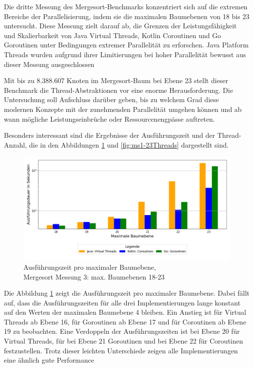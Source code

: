 \documentclass[fontsize=12pt,paper=a4,twoside=semi,parskip=half-,headsepline,headinclude]{scrreprt}
\begin{document}
Die dritte Messung des Mergesort-Benchmarks konzentriert sich auf die extremen Bereiche der Parallelisierung, indem sie die maximalen Baumebenen von 18 bis 23 untersucht. Diese Messung zielt darauf ab, die Grenzen der Leistungsfähigkeit und Skalierbarkeit von Java Virtual Threads, Kotlin Coroutinen und Go Goroutinen unter Bedingungen extremer Parallelität zu erforschen. Java Platform Threads wurden aufgrund ihrer Limitierungen bei hoher Parallelität bewusst aus dieser Messung ausgeschlossen

Mit bis zu 8.388.607 Knoten im Mergesort-Baum bei Ebene 23 stellt dieser Benchmark die Thread-Abstraktionen vor eine enorme Herausforderung. Die Untersuchung soll Aufschluss darüber geben, bis zu welchem Grad diese modernen Konzepte mit der zunehmenden Parallelität umgehen können und ab wann mögliche Leistungseinbrüche oder Ressourcenengpässe auftreten.

Besonders interessant sind die Ergebnisse der Ausführungszeit und der Thread-Anzahl, die in den Abbildungen \ref{fig:ms1-23Zeit} und \ref{fig:ms1-23Threads} dargestellt sind.

\begin{figure}[H]
	\centering
	\includegraphics[scale=0.5]{figures/mergesort/Maximalebauebenen1-23_vcg/execution_time_plot.png}
	\caption{Ausführungszeit pro maximaler Baumebene,\\ Mergesort Messung 3: max. Baumebenen 18-23}
	\label{fig:ms1-23Zeit}
\end{figure}

Die Abbildung \ref{fig:ms1-23Zeit} zeigt die Ausführungszeit pro maximaler Baumebene. Dabei fällt auf, dass die Ausführungszeiten für alle drei Implementierungen lange konstant auf den Werten der maximalen Baumebene 4 bleiben. Ein Anstieg ist für Virtual Threads ab Ebene 16, für Goroutinen ab Ebene 17 und für Coroutinen ab Ebene 19 zu beobachten. Eine Verdoppeln der Ausführungszeiten ist bei Ebene 20 für Virtual Threads, für  bei Ebene 21 Goroutinen und bei Ebene 22 für Coroutinen festzustellen. Trotz dieser leichten Unterschiede zeigen alle Implementierungen eine ähnlich gute Performance
\end{document}
